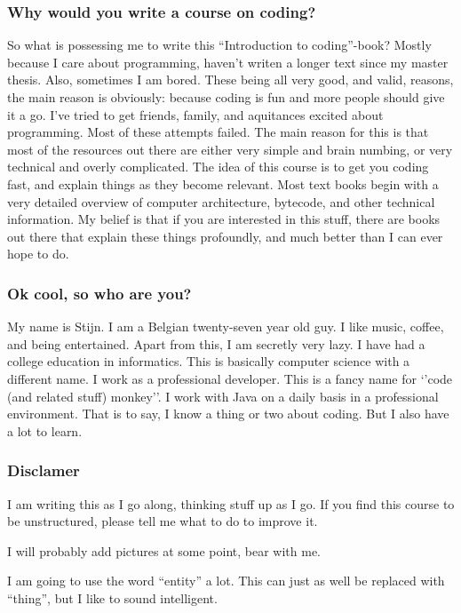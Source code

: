 \documentclass[11pt,fleqn]{book} %
\begin{document}
\subsubsection{Why would you write a course on coding?} So what is possessing me to write this ``Introduction to coding''-book? Mostly because I care about programming, haven't writen a longer text since my master thesis. Also, sometimes I am bored. These being all very good, and valid, reasons, the main reason is obviously: because coding is fun and more people should give it a go.
I've tried to get friends, family, and aquitances excited about programming. Most of these attempts failed. The main reason for this is that most of the resources out there are either very simple and brain numbing, or very technical and overly complicated. The idea of this course is to get you coding fast, and explain things as they become relevant. 
Most text books begin with a very detailed overview of computer architecture, bytecode, and other technical information. My belief is that if you are interested in this stuff, there are books out there that explain these things profoundly, and much better than I can ever hope to do.

\subsubsection{Ok cool, so who are you?}
My name is Stijn. I am a Belgian twenty-seven year old guy. I like music, coffee, and being entertained. Apart from this, I am secretly very lazy.
I have had a college education in informatics. This is basically computer science with a different name. I work as a professional developer.
This is a fancy name for `'code (and related stuff) monkey''.  I work with Java on a daily basis in a professional environment. 
That is to say, I know a thing or two about coding. But I also have a lot to learn.

\subsubsection{Disclamer}
I am writing this as I go along, thinking stuff up as I go. If you find this course to be unstructured, please tell me what to do to improve it.
\begin{remark}
I will probably add pictures at some point, bear with me.
\end{remark}

\begin{remark}
I am going to use the word ``entity'' a lot. This can just as well be replaced with ``thing'', but I like to sound intelligent.
\end{remark}
\end{document}
